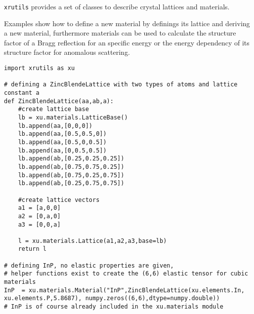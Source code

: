 %
%
%
%


{\tt xrutils} provides a set of classes to describe crystal lattices and
materials.

Examples show how to define a new material by definings its lattice and deriving a new material, furthermore materials can be used to calculate the structure factor of a Bragg reflection for an specific energy or the energy dependency of its structure factor for anomalous scattering.

\begin{lstlisting}[caption=defining a new material from scratch. This consists of an lattice with base and the type of atoms with elastic constantsof the material.]
import xrutils as xu

# defining a ZincBlendeLattice with two types of atoms and lattice constant a
def ZincBlendeLattice(aa,ab,a):
    #create lattice base
    lb = xu.materials.LatticeBase()
    lb.append(aa,[0,0,0])
    lb.append(aa,[0.5,0.5,0])
    lb.append(aa,[0.5,0,0.5])
    lb.append(aa,[0,0.5,0.5])
    lb.append(ab,[0.25,0.25,0.25])
    lb.append(ab,[0.75,0.75,0.25])
    lb.append(ab,[0.75,0.25,0.75])
    lb.append(ab,[0.25,0.75,0.75])

    #create lattice vectors
    a1 = [a,0,0]
    a2 = [0,a,0]
    a3 = [0,0,a]

    l = xu.materials.Lattice(a1,a2,a3,base=lb)
    return l

# defining InP, no elastic properties are given,
# helper functions exist to create the (6,6) elastic tensor for cubic materials
InP  = xu.materials.Material("InP",ZincBlendeLattice(xu.elements.In, xu.elements.P,5.8687), numpy.zeros((6,6),dtype=numpy.double))
# InP is of course already included in the xu.materials module
\end{lstlisting}

